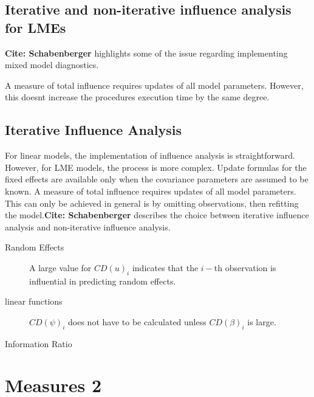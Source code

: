 \documentclass[12pt, a4paper]{article}
\theoremstyle{plain}
\theoremstyle{definition}
\theoremstyle{remark}
\begin{document}
\subsection{Iterative and non-iterative influence analysis for LMEs} %

\textbf{Cite: Schabenberger} highlights some of the issue regarding implementing mixed model diagnostics.

A measure of total influence requires updates of all model parameters. However, this doesnt increase the procedures execution time by the same degree.

\subsection{Iterative Influence Analysis}

For linear models, the implementation of influence analysis is straightforward.
However, for LME models, the process is more complex. Update formulas for the fixed effects are available only when the covariance parameters are assumed to be known. A measure of total influence requires updates of all model parameters. This can only be achieved in general is by omitting observations, then refitting the model.\textbf{Cite: Schabenberger} describes the choice between  iterative influence analysis and  non-iterative influence analysis.



\begin{description}
\item[Random Effects]

A large value for $CD(u)_i$ indicates that the $i-$th observation is influential in predicting random effects.

\item[linear functions]
$CD(\psi)_i$ does not have to be calculated unless $CD(\beta)_i$ is large.


\item[Information Ratio]
\end{description}

\newpage
\section{Measures 2} %
\end{document}
